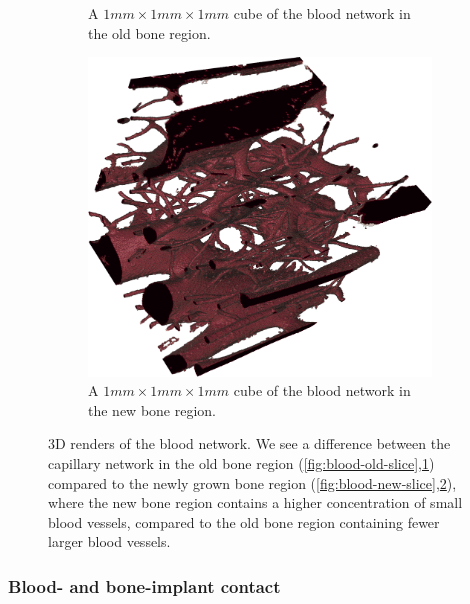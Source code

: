 \begin{figure}
\begin{subfigure}[b]{.48\linewidth}
        \caption{A $1mm \times 1 mm \times 1 mm$ cube of the blood network in the old bone region.}
        \label{fig:blood-old-cube}
    \end{subfigure}
    \hfill
    \begin{subfigure}[b]{.48\linewidth}
    \centering
        \includegraphics[width=.9\linewidth,height=\linewidth]{generated/figure10_new_cube.png}
        \caption{A $1mm \times 1 mm \times 1 mm$ cube of the blood network in the new bone region.}
        \label{fig:blood-new-cube}
    \end{subfigure}
    \caption{
        3D renders of the blood network. We see a difference between the
        capillary network in the old bone region
        (\ref{fig:blood-old-slice},\ref{fig:blood-old-cube}) compared to the
        newly grown bone region
        (\ref{fig:blood-new-slice},\ref{fig:blood-new-cube}), where the new
        bone region contains a higher concentration of small blood vessels,
        compared to the old bone region containing fewer larger blood vessels.
    }
    \label{fig:blood-network}
\end{figure}

\subsubsection{Blood- and bone-implant contact}
\label{sec:contact}

